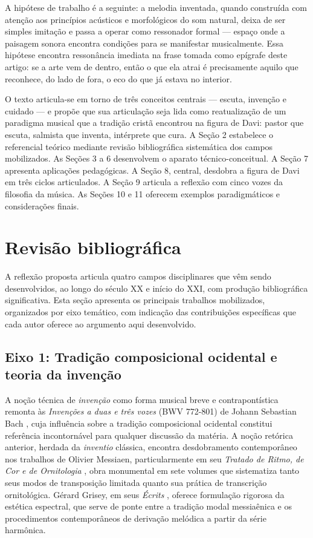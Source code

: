\documentclass[12pt,a4paper]{article}
\begin{document}
A hipótese de trabalho é a seguinte: a melodia inventada, quando construída com atenção aos princípios acústicos e morfológicos do som natural, deixa de ser simples imitação e passa a operar como ressonador formal --- espaço onde a paisagem sonora encontra condições para se manifestar musicalmente. Essa hipótese encontra ressonância imediata na frase tomada como epígrafe deste artigo: se a arte vem de dentro, então o que ela atrai é precisamente aquilo que reconhece, do lado de fora, o eco do que já estava no interior.

O texto articula-se em torno de três conceitos centrais --- escuta, invenção e cuidado --- e propõe que sua articulação seja lida como reatualização de um paradigma musical que a tradição cristã encontrou na figura de Davi: pastor que escuta, salmista que inventa, intérprete que cura. A Seção 2 estabelece o referencial teórico mediante revisão bibliográfica sistemática dos campos mobilizados. As Seções 3 a 6 desenvolvem o aparato técnico-conceitual. A Seção 7 apresenta aplicações pedagógicas. A Seção 8, central, desdobra a figura de Davi em três ciclos articulados. A Seção 9 articula a reflexão com cinco vozes da filosofia da música. As Seções 10 e 11 oferecem exemplos paradigmáticos e considerações finais.

\section{Revisão bibliográfica}

A reflexão proposta articula quatro campos disciplinares que vêm sendo desenvolvidos, ao longo do século XX e início do XXI, com produção bibliográfica significativa. Esta seção apresenta os principais trabalhos mobilizados, organizados por eixo temático, com indicação das contribuições específicas que cada autor oferece ao argumento aqui desenvolvido.

\subsection{Eixo 1: Tradição composicional ocidental e teoria da invenção}

A noção técnica de \textit{invenção} como forma musical breve e contrapontística remonta às \textit{Invenções a duas e três vozes} (BWV 772-801) de Johann Sebastian Bach \citep{Bach1723}, cuja influência sobre a tradição composicional ocidental constitui referência incontornável para qualquer discussão da matéria. A noção retórica anterior, herdada da \textit{inventio} clássica, encontra desdobramento contemporâneo nos trabalhos de Olivier Messiaen, particularmente em seu \textit{Tratado de Ritmo, de Cor e de Ornitologia} \citep{Messiaen1994}, obra monumental em sete volumes que sistematiza tanto seus modos de transposição limitada quanto sua prática de transcrição ornitológica. Gérard Grisey, em seus \textit{Écrits} \citep{Grisey2008}, oferece formulação rigorosa da estética espectral, que serve de ponte entre a tradição modal messiaênica e os procedimentos contemporâneos de derivação melódica a partir da série harmônica.
\end{document}
